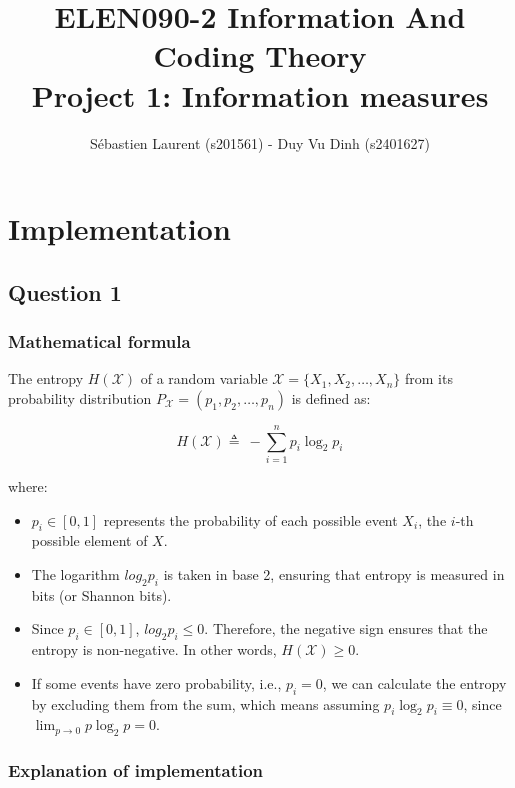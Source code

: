 \documentclass{article}
\title{ELEN090-2 Information And Coding Theory \\
Project 1: Information measures}
\author{Sébastien Laurent (s201561) - Duy Vu Dinh (s2401627)}
\date{}
\begin{document}
\maketitle

\section{Implementation}

\subsection{Question 1}

\subsubsection*{Mathematical formula}

The entropy $H(\mathcal{X})$ of a random variable $\mathcal{X} = \{X_1, X_2, \ldots, X_n\}$ from its probability distribution $P_\mathcal{X} = (p_1, p_2, \ldots, p_n)$ is defined as:

\begin{equation}
\label{eq:entropy}
H(\mathcal{X}) \triangleq \ - \sum_{i=1}^{n} p_i \log_2 p_i
\end{equation}

where:
\begin{itemize}
    \item $p_i \in [0, 1]$ represents the probability of each possible event $X_i$, the $i$-th possible element of $X$.
    \item The logarithm $log_2 p_i$ is taken in base 2, ensuring that entropy is measured in bits (or Shannon bits).
    \item Since $p_i \in [0, 1]$, $log_2 p_i \leq 0$. Therefore, the negative sign ensures that the entropy is non-negative. In other words, $H(\mathcal{X}) \geq 0$.
    \item If some events have zero probability, i.e., \( p_i = 0 \), we can calculate the entropy by excluding them from the sum, which means assuming \( p_i \log_2 p_i \equiv 0 \), since \( \lim_{p \to 0} p \log_2 p = 0 \).

\end{itemize}

\subsubsection*{Explanation of implementation}
\end{document}
